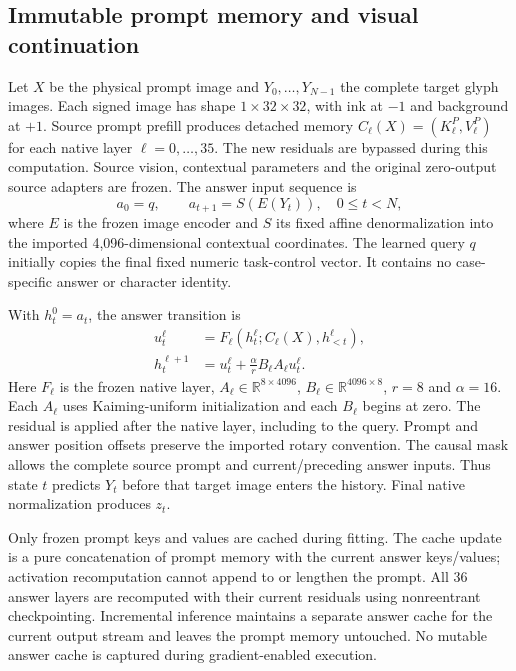 \subsection*{Immutable prompt memory and visual continuation}
Let $X$ be the physical prompt image and $Y_0,\ldots,Y_{N-1}$ the complete target
glyph images. Each signed image has shape $1\times32\times32$, with ink at
$-1$ and background at $+1$. Source prompt prefill produces detached memory
$C_\ell(X)=(K^P_\ell,V^P_\ell)$ for each native layer
$\ell=0,\ldots,35$. The new residuals are bypassed during this computation.
Source vision, contextual parameters and the original zero-output source
adapters are frozen. The answer input sequence is
\begin{equation}
 a_0=q,\qquad a_{t+1}=S(E(Y_t)),\quad 0\leq t<N,
 \label{eq:continuation-input}
\end{equation}
where $E$ is the frozen image encoder and $S$ its fixed affine denormalization
into the imported 4,096-dimensional contextual coordinates. The learned query
$q$ initially copies the final fixed numeric task-control vector. It contains
no case-specific answer or character identity.

With $h^0_t=a_t$, the answer transition is
\begin{align}
 u^\ell_t&=F_\ell(h^\ell_t;C_\ell(X),h^\ell_{<t}),\nonumber\\
 h^{\ell+1}_t&=u^\ell_t+\frac{\alpha}{r}B_\ell A_\ell u^\ell_t.
 \label{eq:continuation-residual}
\end{align}
Here $F_\ell$ is the frozen native layer,
$A_\ell\in\mathbb R^{8\times4096}$,
$B_\ell\in\mathbb R^{4096\times8}$, $r=8$ and $\alpha=16$.
Each $A_\ell$ uses Kaiming-uniform initialization and each $B_\ell$ begins at
zero. The residual is applied after the native layer, including to the query.
Prompt and answer position offsets preserve the imported rotary convention.
The causal mask allows the complete source prompt and current/preceding answer
inputs. Thus state $t$ predicts $Y_t$ before that target image enters the history.
Final native normalization produces $z_t$.

Only frozen prompt keys and values are cached during fitting. The cache update
is a pure concatenation of prompt memory with the current answer keys/values;
activation recomputation cannot append to or lengthen the prompt. All 36 answer
layers are recomputed with their current residuals using nonreentrant
checkpointing. Incremental inference maintains a separate answer cache for
the current output stream and leaves the prompt memory untouched. No mutable
answer cache is captured during gradient-enabled execution.


